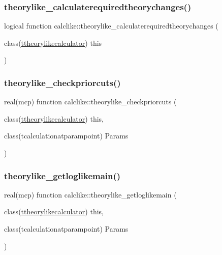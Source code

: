 \subsubsection{\texorpdfstring{theorylike\+\_\+calculaterequiredtheorychanges()}{theorylike\_calculaterequiredtheorychanges()}}
{\footnotesize\ttfamily logical function calclike\+::theorylike\+\_\+calculaterequiredtheorychanges (\begin{DoxyParamCaption}\item[{class(\mbox{\hyperlink{structcalclike_1_1ttheorylikecalculator}{ttheorylikecalculator}})}]{this }\end{DoxyParamCaption})\hspace{0.3cm}{\ttfamily [private]}}

\mbox{\label{namespacecalclike_adffdc491632ae303d023f5e1b704eba4}} 
\subsubsection{\texorpdfstring{theorylike\+\_\+checkpriorcuts()}{theorylike\_checkpriorcuts()}}
{\footnotesize\ttfamily real(mcp) function calclike\+::theorylike\+\_\+checkpriorcuts (\begin{DoxyParamCaption}\item[{class(\mbox{\hyperlink{structcalclike_1_1ttheorylikecalculator}{ttheorylikecalculator}})}]{this,  }\item[{class(tcalculationatparampoint)}]{Params }\end{DoxyParamCaption})\hspace{0.3cm}{\ttfamily [private]}}

\mbox{\label{namespacecalclike_a141801e2c0e794a0411104bca9bb6809}} 
\subsubsection{\texorpdfstring{theorylike\+\_\+getloglikemain()}{theorylike\_getloglikemain()}}
{\footnotesize\ttfamily real(mcp) function calclike\+::theorylike\+\_\+getloglikemain (\begin{DoxyParamCaption}\item[{class(\mbox{\hyperlink{structcalclike_1_1ttheorylikecalculator}{ttheorylikecalculator}})}]{this,  }\item[{class(tcalculationatparampoint)}]{Params }\end{DoxyParamCaption})\hspace{0.3cm}{\ttfamily [private]}}

